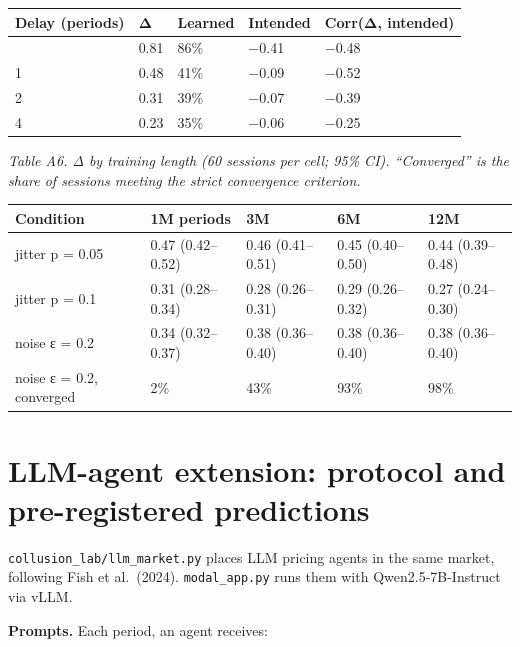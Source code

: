 \documentclass[11pt,a4paper]{article}
\begin{document}
\endgroup

\begingroup\small
\begin{longtable}[]{@{}lllll@{}}
\toprule\noalign{}
Delay (periods) & Δ & Learned & Intended & Corr(Δ, intended) \\
\midrule\noalign{}
\endhead
\bottomrule\noalign{}
\endlastfoot
0 & 0.81 & 86\% & −0.41 & −0.48 \\
1 & 0.48 & 41\% & −0.09 & −0.52 \\
2 & 0.31 & 39\% & −0.07 & −0.39 \\
4 & 0.23 & 35\% & −0.06 & −0.25 \\
\end{longtable}
\endgroup

\begingroup\small\noindent

\emph{Table A6. Δ by training length (60 sessions per cell; 95\% CI). ``Converged'' is the share of sessions meeting the strict convergence criterion.}

\endgroup

\begingroup\small
\begin{longtable}[]{@{}lllll@{}}
\toprule\noalign{}
Condition & 1M periods & 3M & 6M & 12M \\
\midrule\noalign{}
\endhead
\bottomrule\noalign{}
\endlastfoot
jitter p = 0.05 & 0.47 (0.42--0.52) & 0.46 (0.41--0.51) & 0.45 (0.40--0.50) & 0.44 (0.39--0.48) \\
jitter p = 0.1 & 0.31 (0.28--0.34) & 0.28 (0.26--0.31) & 0.29 (0.26--0.32) & 0.27 (0.24--0.30) \\
noise ε = 0.2 & 0.34 (0.32--0.37) & 0.38 (0.36--0.40) & 0.38 (0.36--0.40) & 0.38 (0.36--0.40) \\
noise ε = 0.2, converged & 2\% & 43\% & 93\% & 98\% \\
\end{longtable}
\endgroup

\hypertarget{llm-agent-extension-protocol-and-pre-registered-predictions}{%
\section{LLM-agent extension: protocol and pre-registered predictions}\label{llm-agent-extension-protocol-and-pre-registered-predictions}}

\texttt{collusion\_lab/llm\_market.py} places LLM pricing agents in the same market, following Fish et al.~(2024). \texttt{modal\_app.py} runs them with Qwen2.5-7B-Instruct via vLLM.

\textbf{Prompts.} Each period, an agent receives:
\end{document}
